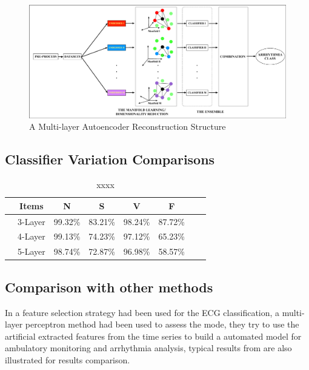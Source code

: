 \documentclass[journal]{IEEEtran}
\begin{document}
\begin{figure}[!htbp]
\includegraphics[width=7in]{EPS/systemStructure.eps}
\caption{A Multi-layer Autoencoder Reconstruction Structure}
\end{figure}



  
\subsection{Classifier Variation Comparisons}
\begin{table}[!htbp]
\begin{center}
\begin{threeparttable}
\caption{xxxx}
\label{aeresults}
\begin{tabular}{cccccccc}
\hline
&  Items & N & S & V & F   \\
\hline
&3-Layer  &99.32\% & 83.21\% &98.24\% &  87.72\%  \\
&4-Layer  &99.13\% & 74.23\%  & 97.12\% & 65.23\%       \\
&5-Layer &98.74\% & 72.87\% & 96.98\% &  58.57\% \\
\hline
\end{tabular}
\end{threeparttable}
\end{center}
\end{table}

  
   

\subsection{Comparison with other methods}
In \cite{mar} a feature selection strategy had been used for the ECG classification, a multi-layer perceptron method had been used to assess the mode, they try to use the artificial extracted features from the time series to build a automated model for ambulatory monitoring and arrhythmia analysis, typical results from \cite{chaza, melgan, jiang} are also illustrated for results comparison.
\end{document}
